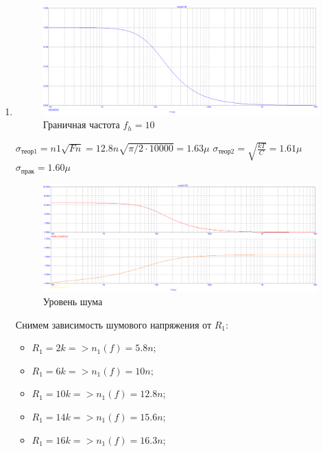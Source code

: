 \documentclass[a4paper, 12pt]{article}%
\begin{document}
\begin{enumerate}

\item

\begin{figure}[h!]
    \centering
    \includegraphics[scale=0.3]{images/mod3_1_1.png}
    \caption{Граничная частота $f_h = 10$}
    \label{fig:m311}
\end{figure}

$\sigma_\text{теор1} = n1\sqrt{Fn} = 12.8n\sqrt{\pi/2 \cdot 10000} = 1.63\mu$
$\sigma_\text{теор2} = \sqrt{\frac{kT}{C}} = 1.61\mu$
$\sigma_\text{прак} = 1.60\mu$

\begin{figure}[h!]
    \centering
    \includegraphics[scale=0.3]{images/mod3_1_2.png}
    \caption{Уровень шума}
    \label{fig:m312}
\end{figure}

Снимем зависимость шумового напряжения от $R_1$:
\begin{itemize}
    \item $R_1 = 2k => n_1(f) = 5.8n$;
    \item $R_1 = 6k => n_1(f) = 10n$;
    \item $R_1 = 10k => n_1(f) = 12.8n$;
    \item $R_1 = 14k => n_1(f) = 15.6n$;
    \item $R_1 = 16k => n_1(f) = 16.3n$;
\end{itemize}


\end{enumerate}
\end{document}
